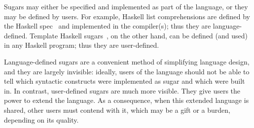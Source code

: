 Sugars may either be specified and implemented as part of the
language, or they may be defined by users. For example, Haskell list
comprehensions are defined by the Haskell spec~\cite{haskell-language} and implemented
in the compiler(s); thus they are language-defined. Template Haskell
sugars~\cite{haskell-templates}, on the other hand, can be defined (and used) in any
Haskell program; thus they are user-defined.

Language-defined sugars are a convenient method of simplifying
language design, and they are largely invisible: ideally,
users of the language should not be able to tell which syntactic
constructs were implemented as sugar and which were built in.
In contrast, user-defined sugars are much more visible. They give
users the power to extend the language. As a consequence, when
this extended language is shared, other users must contend with it,
which may be a gift or a burden, depending on its quality.






